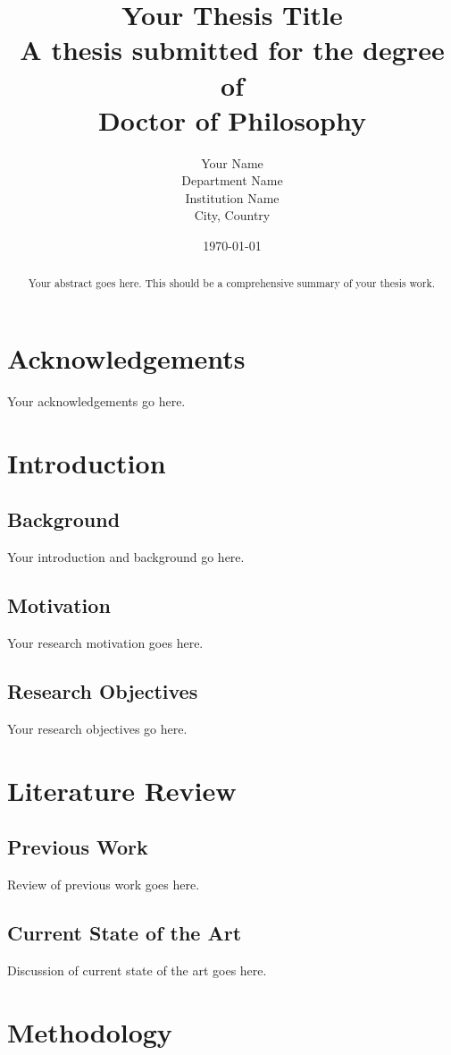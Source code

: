 \documentclass[12pt,a4paper]{report}
\title{\Huge{Your Thesis Title}\\[1cm]
       \Large{A thesis submitted for the degree of}\\
       \Large{Doctor of Philosophy}}
\author{\Large{Your Name}\\[1cm]
        \large{Department Name}\\
        \large{Institution Name}\\
        \large{City, Country}}
\date{\large{\today}}
\begin{document}
\frontmatter
\maketitle

\begin{abstract}
Your abstract goes here. This should be a comprehensive summary of your thesis work.
\end{abstract}

\chapter*{Acknowledgements}
Your acknowledgements go here.

\tableofcontents
\listoffigures
\listoftables

\mainmatter

\chapter{Introduction}
\section{Background}
Your introduction and background go here.

\section{Motivation}
Your research motivation goes here.

\section{Research Objectives}
Your research objectives go here.

\chapter{Literature Review}
\section{Previous Work}
Review of previous work goes here.

\section{Current State of the Art}
Discussion of current state of the art goes here.

\chapter{Methodology}
\end{document}

